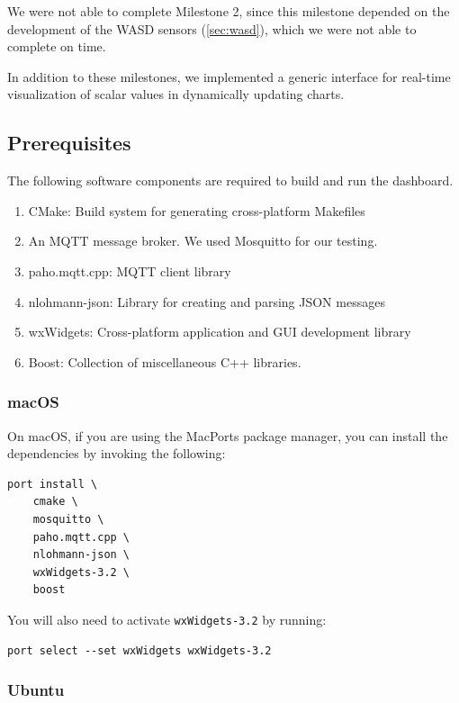 We were not able to complete Milestone 2, since this milestone depended on the
development of the WASD sensors (\autoref{sec:wasd}), which we were not able to
complete on time.

In addition to these milestones, we implemented a generic interface for
real-time visualization of scalar values in dynamically updating charts.

\subsection{Prerequisites}

The following software components are required to build and run the dashboard.

\begin{enumerate}
    \item CMake: Build system for generating cross-platform Makefiles
    \item An MQTT message broker. We used Mosquitto for our testing.
    \item paho.mqtt.cpp: MQTT client library 
    \item nlohmann-json: Library for creating and parsing JSON messages
    \item wxWidgets: Cross-platform application and GUI development library
    \item Boost: Collection of miscellaneous C++ libraries.
\end{enumerate}

\subsubsection{macOS}

On macOS, if you are using the MacPorts package manager, you can install the
dependencies by invoking the following:

\begin{verbatim}
port install \
    cmake \
    mosquitto \
    paho.mqtt.cpp \
    nlohmann-json \
    wxWidgets-3.2 \
    boost
\end{verbatim}

You will also need to activate \texttt{wxWidgets-3.2} by running:

\begin{verbatim}
port select --set wxWidgets wxWidgets-3.2
\end{verbatim}

\subsubsection{Ubuntu}

